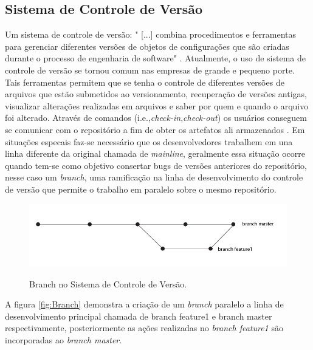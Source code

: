 \subsection{Sistema de Controle de Versão}
Um sistema de controle de versão: "	[...] combina procedimentos e ferramentas para gerenciar diferentes versões de objetos de configurações que são criadas durante o processo de engenharia de software" \cite[p.~927]{pressman2010}.
Atualmente, o uso de sistema de controle de versão se tornou comum nas empresas de grande e pequeno porte. Tais ferramentas permitem que se tenha o controle de diferentes versões de arquivos que estão submetidos ao versionamento, recuperação de versões antigas, visualizar alterações realizadas em arquivos e saber por quem e quando o arquivo foi alterado. Através de comandos (i.e.,\textit{check-in},\textit{check-out}) os usuários conseguem se comunicar com o repositório a fim de obter os artefatos ali armazenados \cite{gleiph2011}. Em situações especais faz-se necessário que os desenvolvedores trabalhem em una linha diferente da original chamada de \textit{mainline}, geralmente essa situação ocorre quando tem-se como objetivo consertar bugs de versões anteriores do repositório, nesse caso um \textit{branch}, uma ramificação na linha de desenvolvimento do controle de versão que permite o trabalho em paralelo sobre o mesmo repositório.
\begin{figure}[h]
\centering
\caption[Branch no Sistema de Controle de Versão]{Branch no Sistema de Controle de Versão.}
\includegraphics[width=0.7\linewidth]{./images/branch}
\label{fig:Branch}
\end{figure}
A figura \autoref{fig:Branch} demonstra a criação de um \textit{branch} paralelo a linha de desenvolvimento principal chamada de branch feature1 e branch master respectivamente, posteriormente as ações realizadas no \textit{branch feature1} são incorporadas ao \textit{branch master}.
